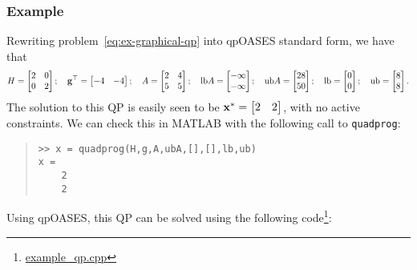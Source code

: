 \documentclass[10pt]{article}
\begin{document}
\subsubsection*{Example}
Rewriting problem~\eqref{eq:ex-graphical-qp} into qpOASES standard form, we have that
\begin{equation*}
H=\begin{bmatrix}2&0\\0&2\end{bmatrix}
;\quad
\mathbf{g}^\top=\begin{bmatrix}-4&-4\end{bmatrix}
;\quad
A=\begin{bmatrix}2&4\\5&5\end{bmatrix}
;\quad
\text{lb} A=\begin{bmatrix}-\infty\\-\infty\end{bmatrix}
;\quad
\text{ub} A=\begin{bmatrix}28\\50\end{bmatrix}
;\quad
\text{lb}=\begin{bmatrix}0\\0\end{bmatrix}
;\quad
\text{ub}=\begin{bmatrix}8\\8\end{bmatrix}.
\end{equation*}
The solution to this QP is easily seen to be $\mathbf{x}^*=\begin{bmatrix}2&2\end{bmatrix}$, with no active constraints.
We can check this in MATLAB with the following call to \texttt{quadprog}:
\begin{quote}
\begin{verbatim}
>> x = quadprog(H,g,A,ubA,[],[],lb,ub)
x =
    2
    2
\end{verbatim}
\end{quote}
Using qpOASES, this QP can be solved using the following code\footnote{\href{https://github.com/plusk01/tests/blob/master/qpOASES/src/example_qp.cpp}{example\_qp.cpp}}:
\end{document}
